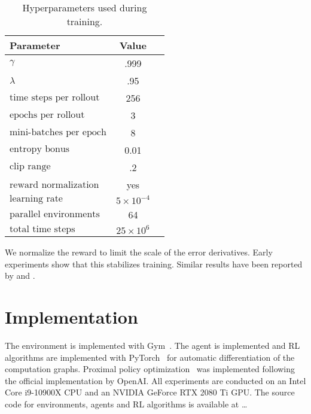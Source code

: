 \begin{table}
    \centering
    \caption{Hyperparameters used during training.}
    \begin{tabular}{lcc}
        \toprule
        \textbf{Parameter} & \textbf{Value} \\
        \midrule
        \(\gamma\) & .999 \\
        \(\lambda\) & .95 \\
        \(\text{time steps per rollout}\) & 256 \\
        \(\text{epochs per rollout}\) & 3 \\
        \(\text{mini-batches per epoch}\) & 8 \\
        \(\text{entropy bonus}\) & 0.01 \\
        \(\text{clip range}\) & .2 \\
        \(\text{reward normalization}\) & yes \\
        \(\text{learning rate}\) & \(5 \times 10^{-4}\) \\
        \(\text{parallel environments}\) & 64 \\
        \(\text{total time steps}\) & \(25 \times 10^6\) \\
        \bottomrule
    \end{tabular}
    \label{tab:hyperparameters}
\end{table}

We normalize the reward to limit the scale of the error derivatives.
Early experiments show that this stabilizes training.
Similar results have been reported by \cite{andrychowicz_empirical_2020} and \cite{mnih_atari_2013}.

\section{Implementation}

The environment is implemented with Gym~\cite{brockman_gym_2016}. The agent is implemented and RL algorithms are implemented with PyTorch~\cite{paszke_pytorch_nodate} for automatic differentiation of the computation graphs.
Proximal policy optimization~\cite{schulman_ppo_2017} was implemented following the official implementation by OpenAI.
All experiments are conducted on an Intel Core i9-10900X CPU and an NVIDIA GeForce RTX 2080 Ti GPU.
The source code for environments, agents and RL algorithms is available at \dots
{}

